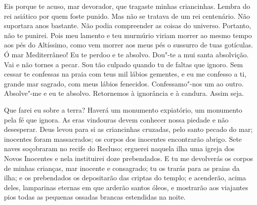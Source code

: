 Eis porque te acuso, mar devorador, que tragaste minhas criancinhas. Lembra
do rei asiático por quem foste punido. Mas não se tratava de um rei
centenário. Não suportara anos bastante. Não podia compreender as coisas
do universo. Portanto, não te punirei. Pois meu lamento e teu murmúrio
viriam morrer ao mesmo tempo aos pés do Altíssimo, como vem morrer aos
meus pés o sussurro de tuas gotículas. Ó mar Mediterrâneo! Eu te perdoo e
te absolvo. Dou"-te a mui santa absolvição. Vai e não tornes a pecar. Sou
tão culpado quando tu de faltas que ignoro. Sem cessar te confessas na
praia com teus mil lábios gementes, e eu me confesso a ti, grande mar
sagrado, com meus lábios fenecidos. Confessamo"-nos um ao outro. Absolve"-me
e eu te absolvo. Retornemos à ignorância e à candura. Assim seja.

Que farei eu sobre a terra? Haverá um monumento expiatório, um monumento
pela fé que ignora. As eras vindouras devem conhecer nossa piedade e não
desesperar. Deus levou para si as criancinhas cruzadas, pelo santo pecado
do mar; inocentes foram massacrados; os corpos dos inocentes encontrarão
abrigo. Sete naves soçobraram no recife do Recluso; erguerei naquela ilha
uma igreja dos Novos Inocentes e nela instituirei doze prebendados. E tu
me devolverás os corpos de minhas crianças, mar inocente e consagrado; tu
os trarás para as praias da ilha; e os prebendados os depositarão das
criptas do templo; e acenderão, acima deles, lamparinas eternas em que
arderão santos óleos, e mostrarão aos viajantes pios todas as pequenas
ossadas brancas estendidas na noite.



